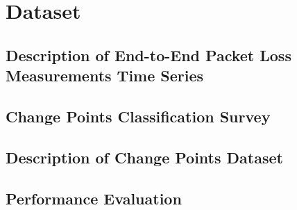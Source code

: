 \chapter{Dataset}

\section{Description of End-to-End Packet Loss Measurements Time Series}
\section{Change Points Classification Survey}
\section{Description of Change Points Dataset}
\section{Performance Evaluation}

